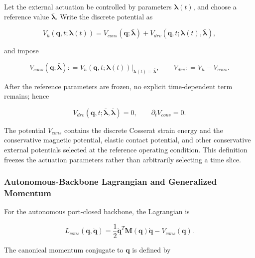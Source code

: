Let the external actuation be controlled by parameters \(\bm{\lambda}(t)\), and choose a reference value \(\bar{\bm{\lambda}}\). Write the discrete potential as

\begin{equation}
\label{eq:hamiltonian-3-5}
V_{h}\left( \mathbf{q},t;\bm{\lambda}(t) \right) = V_{cons}\left( \mathbf{q};\bar{\bm{\lambda}} \right) + V_{drv}\left( \mathbf{q},t;\bm{\lambda}(t),\bar{\bm{\lambda}} \right),
\end{equation}

and impose

\begin{equation}
\label{eq:hamiltonian-3-6}
V_{cons}\left( \mathbf{q};\bar{\bm{\lambda}} \right): = V_{h}\left( \mathbf{q},t;\bm{\lambda}(t) \right)|_{\bm{\lambda}(t) \equiv \bar{\bm{\lambda}}},\quad\quad V_{drv}: = V_{h} - V_{cons}.
\end{equation}

After the reference parameters are frozen, no explicit time-dependent term remains; hence

\begin{equation}
\label{eq:hamiltonian-3-7}
\boxed{V_{drv}\left( \mathbf{q},t;\bar{\bm{\lambda}},\bar{\bm{\lambda}} \right) = 0,\quad\quad\partial_{t}V_{cons} = 0.}
\end{equation}

The potential \(V_{cons}\) contains the discrete Cosserat strain energy and the conservative magnetic potential, elastic contact potential, and other conservative external potentials selected at the reference operating condition. This definition freezes the actuation parameters rather than arbitrarily selecting a time slice.

\subsubsection{Autonomous-Backbone Lagrangian and Generalized Momentum}\label{sec:hamiltonian-3-2-2}

For the autonomous port-closed backbone, the Lagrangian is

\begin{equation}
\label{eq:hamiltonian-3-8}
\boxed{L_{cons}\left( \mathbf{q},\dot{\mathbf{q}} \right) = \frac{1}{2}{\dot{\mathbf{q}}}^{T}\mathbf{M}\left( \mathbf{q} \right)\dot{\mathbf{q}} - V_{cons}\left( \mathbf{q} \right).}
\end{equation}

The canonical momentum conjugate to \(\mathbf{q}\) is defined by\cite{MarsdenRatiu1999MechanicsSymmetry,Arnold1989ClassicalMechanics}

